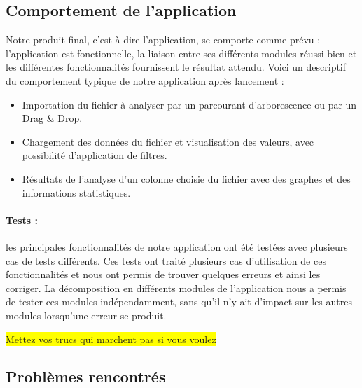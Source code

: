 		\subsection{Comportement de l'application}
		Notre produit final, c'est à dire l'application, se comporte comme prévu : l'application est fonctionnelle, la liaison entre ses différents modules réussi bien et les différentes fonctionnalités fournissent le résultat attendu. Voici un descriptif du comportement typique de notre application après lancement :
		\begin{itemize}
			\item Importation du fichier à analyser par un parcourant d'arborescence ou par un Drag \& Drop.
			\item Chargement des données du fichier et visualisation des valeurs, avec possibilité d'application de filtres. 
			\item Résultats de l'analyse d'un colonne choisie du fichier avec des graphes et des informations statistiques.
		\end{itemize}
		\paragraph{Tests :} les principales fonctionnalités de notre application ont été testées avec plusieurs cas de tests différents. Ces tests ont traité plusieurs cas d'utilisation de ces fonctionnalités et nous ont permis de trouver quelques erreurs et ainsi les corriger. La décomposition en différents modules de l'application nous a permis de tester ces modules indépendamment, sans qu'il n'y ait d'impact sur les autres modules lorsqu'une erreur se produit.
		
		\colorbox{yellow}{Mettez vos trucs qui marchent pas si vous voulez}
		
		\subsection{Problèmes rencontrés}
